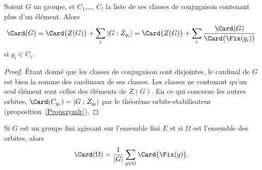 \begin{corollary}
	Soient \( G\) un groupe, et \( C_1\),\ldots, \( C_l\) la liste de ses classes de conjugaison contenant plus d'un élément. Alors
	\begin{equation}    \label{EqkgGmoq}
		\Card(G)=\Card\big( Z(G) \big)+\sum_i| G:Z_{g_i} |=\Card\big( Z(G) \big)+\sum_i\frac{ \Card(G) }{ \Card\big( \Fix(g_i) \big) }
	\end{equation}
	si \( g_i\in C_i\).
\end{corollary}

\begin{proof}
	Étant donné que les classes de conjugaison sont disjointes, le cardinal de \( G\) est bien la somme des cardinaux de ses classes. Les classes ne contenant qu'un seul élément sont celles des éléments de \( Z(G)\). En ce qui concerne les autres orbites, \( \Card(C_{g_i})=| G:Z_{g_i} |\) par le théorème orbite-stabilisateur (proposition~\ref{Propszymlr}).
\end{proof}

\begin{theorem}      \label{THOooEFDMooDfosOw}
	Si \( G\) est un groupe fini agissant sur l'ensemble fini \( E\) et si \( \Omega\) est l'ensemble des orbites, alors
	\begin{equation}    \label{EqTUsblv}
		\Card(\Omega)=\frac{1}{ | G | }\sum_{g\in G}\Card\big( \Fix(g) \big).
	\end{equation}
\end{theorem}

